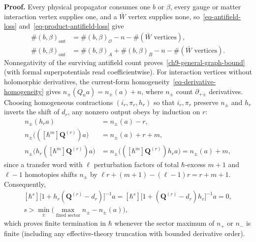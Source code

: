 \documentclass[11pt]{article}
\numberwithin{equation}{section}
\numberwithin{figure}{section}
\numberwithin{table}{section}
\begin{document}
\begin{proofbox}
\textbf{Proof.} Every physical propagator consumes one $b$ or $\beta$, every gauge or matter interaction vertex supplies one, and a $\bar W$ vertex supplies none, so~\eqref{eq-antifield-loss} and~\eqref{eq-product-antifield-loss} give
\begin{equation}\label{ch9-antifield-count}
\begin{aligned}
\#(b,\beta)_{\mathrm{out}}
&=\#(b,\beta)_{\mathcal O}-n-\#(\bar W\text{ vertices}),\\
\#(b,\beta)_{\mathrm{out}}
&=\#(b,\beta)_A+\#(b,\beta)_B-n-\#(\bar W\text{ vertices}).
\end{aligned}
\end{equation}
Nonnegativity of the surviving antifield count proves~\eqref{ch9-general-graph-bound} (with formal superpotentials read coefficientwise).
For interaction vertices without holomorphic derivatives, the current-form homogeneity~\eqref{eq-derivative-homogeneity} gives $n_\pm(Q_n a)=n_\pm(a)+n$, where $n_\pm$ count $\partial_{+\dot\pm}$ derivatives. Choosing homogeneous contractions $(i_r,\pi_r,h_r)$ so that $i_r,\pi_r$ preserve $n_\pm$ and $h_r$ inverts the shift of $d_r$, any nonzero output obeys by induction on $r$:
\begin{equation}\label{eq-ch8-transfer-lowering}
\begin{aligned}
n_\pm(h_ra)&=n_\pm(a)-r,\\
n_\pm\bigl(([\hbar^m]\mathbf Q^{(r)})a\bigr)&=n_\pm(a)+r+m,\\
n_\pm\bigl(h_r([\hbar^m]\mathbf Q^{(r)})a\bigr)
&=n_\pm\bigl(([\hbar^m]\mathbf Q^{(r)})h_ra\bigr)=n_\pm(a)+m,
\end{aligned}
\end{equation}
since a transfer word with $\ell$ perturbation factors of total $\hbar$-excess $m+1$ and $\ell-1$ homotopies shifts $n_\pm$ by $\ell r+(m+1)-(\ell-1)r=r+m+1$. Consequently,
\begin{equation}\label{eq-ch8-transfer-finite-inverses}
\begin{gathered}
[\hbar^s]\bigl[1+h_r(\mathbf Q^{(r)}-d_r)\bigr]^{-1}a
=[\hbar^s]\bigl[1+(\mathbf Q^{(r)}-d_r)h_r\bigr]^{-1}a=0,\\
s>\min_{\pm}\bigl(\max_{\text{fixed sector}}n_\pm-n_\pm(a)\bigr),
\end{gathered}
\end{equation}
which proves finite termination in $\hbar$ whenever the sector maximum of $n_+$ or $n_-$ is finite (including any effective-theory truncation with bounded derivative order).~\hfill\qedsymbol
\end{proofbox}
\end{document}
